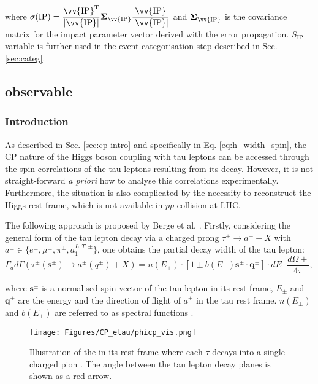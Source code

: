 where $\sigma(\text{IP}) = \dfrac{\vv{\text{IP}}^{\text{T}}}{|\vv{\text{IP}}|}\boldsymbol{\Sigma}_{\vv{\text{IP}}}\dfrac{\vv{\text{IP}}}{|\vv{\text{IP}}|}$ and $\boldsymbol{\Sigma}_{\vv{\text{IP}}}$ is the covariance matrix for the impact parameter vector derived with the error propagation. $S_{\text{IP}}$ variable is further used in the event categorisation step described in Sec. \ref{sec:categ}.

\subsection{\phicp observable}\label{sec:phicp}
\subsubsection{Introduction}
As described in Sec. \ref{sec:cp-intro} and specifically in Eq. \ref{eq:h_width_spin}, the CP nature of the Higgs boson coupling with tau leptons can be accessed through the spin correlations of the tau leptons resulting from its decay. However, it is not straight-forward \textit{a priori} how to analyse this correlations experimentally. Furthermore, the situation is also complicated by the necessity to reconstruct the Higgs rest frame, which is not available in $pp$ collision at LHC. 

The following approach is proposed by Berge et al. \cite{Berge:2011ij, Berge:2014sra, Berge:2014wta}. Firstly, considering the general form of the tau lepton decay via a charged prong $\tau^\pm \to a^\pm + X$ with $a^\pm \in \{e^\pm, \mu^\pm, \pi^\pm, a_1^{L,T,\pm}\}$, one obtains the partial decay width of the tau lepton:
\begin{equation}\label{eq:tau_width}
    \Gamma_ad\Gamma(\tau^\pm(\boldsymbol{s}^\pm) \to a^\pm(q^\pm)+X) = n(E_\pm)\cdot[1 \pm b(E_\pm) \boldsymbol{s}^\pm \cdot \boldsymbol{q}^\pm]\cdot dE_\pm\dfrac{d\Omega\pm}{4\pi},
\end{equation}

where $\boldsymbol{s}^\pm$ is a normalised spin vector of the tau lepton in its rest frame, $E_\pm$ and $\boldsymbol{q}^\pm$ are the energy and the direction of flight of $a^\pm$ in the tau rest frame. $n(E_\pm)$ and $b(E_\pm)$ are referred to as spectral functions \cite{Berge:2011ij}. 

\begin{figure}[t!]
    \centering
    \texttt{[image: Figures/CP\_etau/phicp\_vis.png]}
    \caption{Illustration of the \htt in its rest frame where each $\tau$ decays into a single charged pion \cite{CMS:2021sdq}. The \phicp angle between the tau lepton decay planes is shown as a red arrow.}
    \label{fig:phicp_vis}
\end{figure}

